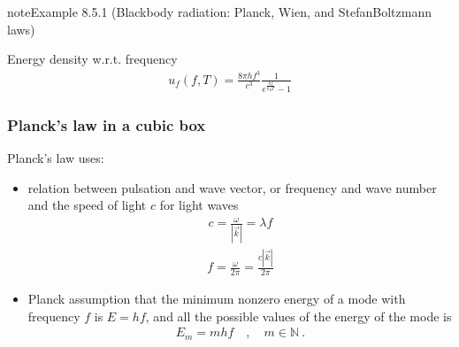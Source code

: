 \documentclass[letterpaper,10pt,english]{jupyterBook}
\begin{document}
\begin{sphinxadmonition}{note}{Example 8.5.1 (Black\sphinxhyphen{}body radiation: Planck, Wien, and Stefan\sphinxhyphen{}Boltzmann laws)}



\sphinxAtStartPar
{} Energy density w.r.t. frequency
\begin{equation*}
\begin{split}u_{f}(f, T) = \frac{8 \pi h f^3}{c^3} \frac{1}{e^{\frac{hf}{k_B T}} - 1}\end{split}
\end{equation*}\subsubsection*{Planck’s law in a cubic box}

\sphinxAtStartPar
Planck’s law uses:
\begin{itemize}
\item {} 
\sphinxAtStartPar
relation between pulsation and wave vector, or frequency and wave number and the speed of light \(c\) for light waves
\begin{equation*}
\begin{split}c = \frac{\omega}{|\vec{k}|} = \lambda f\end{split}
\end{equation*}\begin{equation*}
\begin{split}f = \frac{\omega}{2\pi} = \frac{c |\vec{k}|}{2 \pi}\end{split}
\end{equation*}
\item {} 
\sphinxAtStartPar
Planck assumption that the minimum non\sphinxhyphen{}zero energy of a mode with frequency \(f\) is \(E = h f\), and all the possible values of the energy of the mode is
\begin{equation*}
\begin{split}E_m = m h f \quad , \quad m \in \mathbb{N} \ .\end{split}
\end{equation*}
\end{itemize}


\end{sphinxadmonition}
\end{document}
